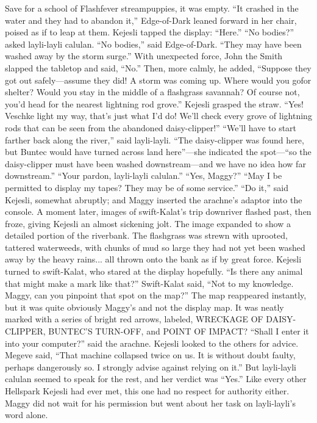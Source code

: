 \documentclass[9pt]{article}
\begin{document}
Save for a school of Flashfever streampuppies, it was empty.
“It crashed in the water and they had to abandon it,” Edge-of-Dark leaned forward in her chair,
poised as if to leap at them.
Kejesli tapped the display: “Here.”
“No bodies?” asked layli-layli calulan.
“No bodies,” said Edge-of-Dark. “They may have been washed away by the storm surge.”
With unexpected force, John the Smith slapped the tabletop and said, “No.” Then, more calmly, he
added, “Suppose they got out safely—assume they did! A storm was coming up. Where would you gofor shelter? Would you stay in the middle of a flashgrass savannah? Of course not, you’d head for the
nearest lightning rod grove.”
Kejesli grasped the straw. “Yes! Veschke light my way, that’s just what I’d do! We’ll check every
grove of lightning rods that can be seen from the abandoned daisy-clipper!”
“We’ll have to start farther back along the river,” said layli-layli. “The daisy-clipper was found here,
but Buntec would have turned across land here”—she indicated the spot—“so the daisy-clipper must
have been washed downstream—and we have no idea how far downstream.”
“Your pardon, layli-layli calulan.”
“Yes, Maggy?”
“May I be permitted to display my tapes? They may be of some service.”
“Do it,” said Kejesli, somewhat abruptly; and Maggy inserted the arachne’s adaptor into the console.
A moment later, images of swift-Kalat’s trip downriver flashed past, then froze, giving Kejesli an almost
sickening jolt. The image expanded to show a detailed portion of the riverbank. The flashgrass was
strewn with uprooted, tattered waterweeds, with chunks of mud so large they had not yet been washed
away by the heavy rains... all thrown onto the bank as if by great force.
Kejesli turned to swift-Kalat, who stared at the display hopefully. “Is there any animal that might
make a mark like that?”
Swift-Kalat said, “Not to my knowledge. Maggy, can you pinpoint that spot on the map?”
The map reappeared instantly, but it was quite obviously Maggy’s and not the display map. It was
neatly marked with a series of bright red arrows, labeled, WRECKAGE OF DAISY-CLIPPER,
BUNTEC’S TURN-OFF, and POINT OF IMPACT?
“Shall I enter it into your computer?” said the arachne.
Kejesli looked to the others for advice. Megeve said, “That machine collapsed twice on us. It is
without doubt faulty, perhaps dangerously so. I strongly advise against relying on it.”
But layli-layli calulan seemed to speak for the rest, and her verdict was “Yes.”
Like every other Hellspark Kejesli had ever met, this one had no respect for authority either. Maggy
did not wait for his permission but went about her task on layli-layli’s word alone.
\end{document}
